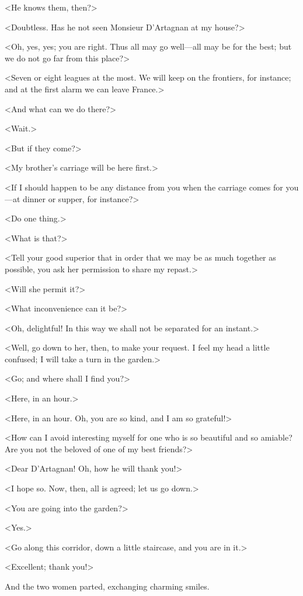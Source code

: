 <He knows them, then?> 

<Doubtless. Has he not seen Monsieur D'Artagnan at my house?> 

<Oh, yes, yes; you are right. Thus all may go well—all may be for the best; but we do not go far from this place?> 

<Seven or eight leagues at the most. We will keep on the frontiers, for instance; and at the first alarm we can leave France.> 

<And what can we do there?> 

<Wait.> 

<But if they come?> 

<My brother's carriage will be here first.> 

<If I should happen to be any distance from you when the carriage comes for you—at dinner or supper, for instance?> 

<Do one thing.> 

<What is that?> 

<Tell your good superior that in order that we may be as much together as possible, you ask her permission to share my repast.> 

<Will she permit it?> 

<What inconvenience can it be?> 

<Oh, delightful! In this way we shall not be separated for an instant.> 

<Well, go down to her, then, to make your request. I feel my head a little confused; I will take a turn in the garden.> 

<Go; and where shall I find you?> 

<Here, in an hour.> 

<Here, in an hour. Oh, you are so kind, and I am so grateful!> 

<How can I avoid interesting myself for one who is so beautiful and so amiable? Are you not the beloved of one of my best friends?> 

<Dear D'Artagnan! Oh, how he will thank you!> 

<I hope so. Now, then, all is agreed; let us go down.> 

<You are going into the garden?> 

<Yes.> 

<Go along this corridor, down a little staircase, and you are in it.> 

<Excellent; thank you!> 

And the two women parted, exchanging charming smiles. 

